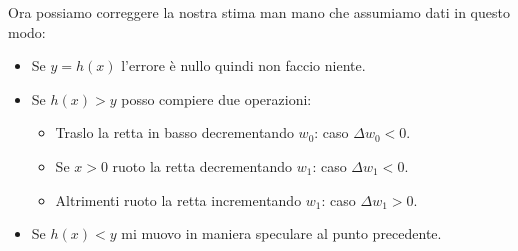 Ora possiamo correggere la nostra stima man mano che assumiamo dati in questo modo:
\begin{itemize}
	\item Se $y = h(x)$ l'errore \`e nullo quindi non faccio niente.
	\item Se $h(x) > y$ posso compiere due operazioni:
	      \begin{itemize}
		      \item Traslo la retta in basso decrementando $w_0$: caso $\Delta w_0 < 0$.
		      \item Se $x > 0$ ruoto la retta decrementando $w_1$: caso $\Delta w_1 < 0$.
		      \item Altrimenti ruoto la retta incrementando $w_1$: caso $\Delta w_1 > 0$.
	      \end{itemize}
	\item Se $h(x) < y$ mi muovo in maniera speculare al punto precedente.
\end{itemize}